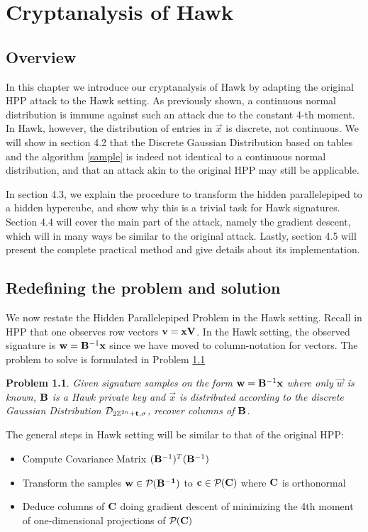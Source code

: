 \newtheorem{hpp_problem_hawk}{Problem}

\chapter{Cryptanalysis of Hawk}
\section{Overview}
In this chapter we introduce our cryptanalysis of Hawk by adapting the original HPP attack to the Hawk setting.
As previously shown, a continuous normal distribution is immune against such an attack due to the constant 4-th moment. In Hawk, however, the distribution of entries in $\vec{x}$ is discrete, not continuous.
We will show in section 4.2 that the Discrete Gaussian Distribution based on tables and the algorithm \ref{sample} is indeed not identical to a continuous normal distribution, and that an attack akin to the original HPP may still be applicable.

In section 4.3, we explain the procedure to transform the hidden parallelepiped to a hidden hypercube, and show why this is a trivial task for Hawk signatures.
Section 4.4 will cover the main part of the attack, namely the gradient descent, which will in many ways be similar to the original attack.
Lastly, section 4.5 will present the complete practical method and give details about its implementation.

\section{Redefining the problem and solution}

We now restate the Hidden Parallelepiped Problem in the Hawk setting.
Recall in HPP that one observes row vectors $\mathbf{v} = \mathbf{x} \mathbf{V}$. In the Hawk setting, the observed signature is $\mathbf{w} = \mathbf{B}^{-1} \mathbf{x}$ since we have moved to column-notation for vectors. 
The problem to solve is formulated in Problem \ref{HPP problem Hawk}

\begin{hpp_problem_hawk}\label{HPP problem Hawk}
Given signature samples on the form $\mathbf{w} = \mathbf{B}^{-1} \mathbf{x}$ where only $\vec{w}$ is known, $\mathbf{B}$ is a Hawk private key and $\vec{x}$ is distributed according to the discrete Gaussian Distribution $\mathcal{D}_{2\mathbb{Z}^{2n} + \mathbf{t}, \sigma}$,
recover columns of $\mathbf{B}$.
\end{hpp_problem_hawk}
The general steps in Hawk setting will be similar to that of the original HPP:
\begin{itemize}
    \item Compute Covariance Matrix $(\mathbf{B}^{-1})^T (\mathbf{B}^{-1})$
    \item Transform the samples $\mathbf{w} \in \mathcal{P}_{}(\mathbf{\mathbf{B}^{-1}})$ to $\mathbf{c} \in \mathcal{P}_{}(\mathbf{C})$ where $\mathbf{C}$ is orthonormal
    \item Deduce columns of $\mathbf{C}$ doing gradient descent of minimizing the 4th moment of one-dimensional projections of $\mathcal{P}_{}(\mathbf{C})$
\end{itemize}

